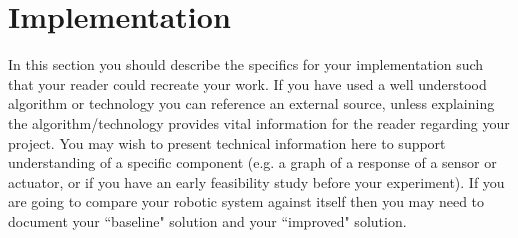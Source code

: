 \documentclass[conference]{IEEEtran}
\begin{document}










\section{Implementation}

In this section you should describe the specifics for your implementation such that your reader could recreate your work.  If you have used a well understood algorithm or technology you can reference an external source, unless explaining the algorithm/technology provides vital information for the reader regarding your project.  You may wish to present technical information here to support understanding of a specific component (e.g. a graph of a response of a sensor or actuator, or if you have an early feasibility study before your experiment).  If you are going to compare your robotic system against itself then you may need to document your ``baseline" solution and your ``improved" solution.  
\end{document}

